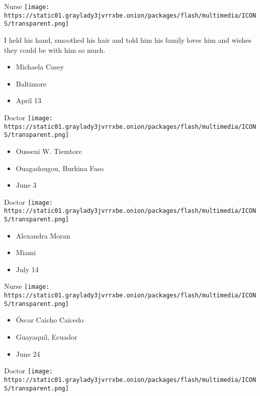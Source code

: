 \protect\hyperlink{item-michaela-casey}{}

Nurse
\texttt{[image: https://static01.graylady3jvrrxbe.onion/packages/flash/multimedia/ICONS/transparent.png]}

I held his hand, smoothed his hair and told him his family loves him and
wishes they could be with him so much.

\begin{itemize}
\tightlist
\item
  Michaela Casey
\item
  Baltimore
\item
  April 13
\end{itemize}

\protect\hyperlink{item-ousseni-w-tiemtore}{}

Doctor
\texttt{[image: https://static01.graylady3jvrrxbe.onion/packages/flash/multimedia/ICONS/transparent.png]}

\begin{itemize}
\tightlist
\item
  Ousseni W. Tiemtore
\item
  Ouagadougou, Burkina Faso
\item
  June 3
\end{itemize}

\protect\hyperlink{item-alexandra-moran}{}

Doctor
\texttt{[image: https://static01.graylady3jvrrxbe.onion/packages/flash/multimedia/ICONS/transparent.png]}

\begin{itemize}
\tightlist
\item
  Alexandra Moran
\item
  Miami
\item
  July 14
\end{itemize}

\protect\hyperlink{item-oscar-caicho-caicedo}{}

Nurse
\texttt{[image: https://static01.graylady3jvrrxbe.onion/packages/flash/multimedia/ICONS/transparent.png]}

\begin{itemize}
\tightlist
\item
  Óscar Caicho Caicedo
\item
  Guayaquil, Ecuador
\item
  June 24
\end{itemize}

\protect\hyperlink{item-chanel-fischetti}{}

Doctor
\texttt{[image: https://static01.graylady3jvrrxbe.onion/packages/flash/multimedia/ICONS/transparent.png]}

